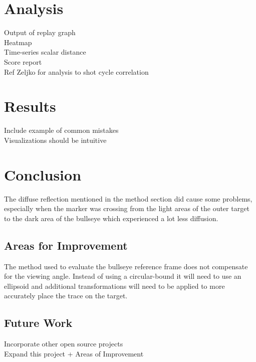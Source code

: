 \documentclass[conference]{IEEEtran}
\begin{document}
\section{Analysis}

\noindent
\textlangle Output of replay graph \textrangle \\
\textlangle Heatmap \textrangle \\
\textlangle Time-series scalar distance \textrangle \\
\textlangle Score report \textrangle \\
\textlangle Ref Zeljko for analysis to shot cycle correlation \textrangle

\section{Results}

\noindent
\textlangle Include example of common mistakes \textrangle \\
\textlangle Visualizations should be intuitive \textrangle

\section{Conclusion}

The diffuse reflection mentioned in the method section did cause some problems, especially when the marker was crossing from the light areas of the outer target to the dark area of the bullseye which experienced a lot less diffusion.

\subsection{Areas for Improvement}
The method used to evaluate the bullseye reference frame does not compensate for the viewing angle. Instead of using a circular-bound it will need to use an ellipsoid and additional transformations will need to be applied to more accurately place the trace on the target.

\subsection{Future Work}

\noindent
\textlangle Incorporate other open source projects \textrangle \\
\textlangle Expand this project + Areas of Improvement \textrangle

\clearpage


\end{document}
